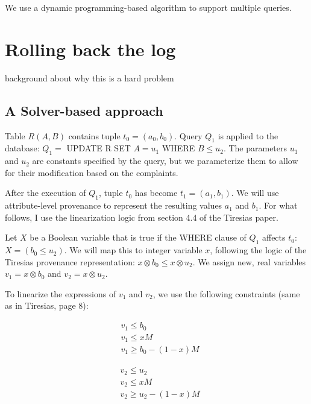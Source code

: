 We use a dynamic programming-based algorithm to support multiple queries.




\section{Rolling back the log}

background about why this is a hard problem

\subsection{A Solver-based approach}

Table $R(A,B)$ contains tuple $t_0=(a_0,b_0)$. Query $Q_1$ is applied to the
database: $Q_1 =$ UPDATE R SET $A=u_1$ WHERE $B\leq u_2$. The parameters $u_1$
and $u_2$ are constants specified by the query, but we parameterize them to
allow for their modification based on the complaints.

\smallskip

After the execution of $Q_1$, tuple $t_0$ has become $t_1=(a_1,b_1)$. We will
use attribute-level provenance to represent the resulting values $a_1$ and
$b_1$. For what follows, I use the linearization logic from section 4.4 of the
Tiresias paper.

\smallskip


Let $X$ be a Boolean variable that is true if the WHERE clause of $Q_1$
affects $t_0$: $X=(b_0\leq u_2)$. We will map this to integer variable $x$,
following the logic of the Tiresias provenance representation: $x\otimes
b_0\leq x\otimes u_2$.  We assign new, real variables $v_1= x\otimes
b_0$ and $v_2=x\otimes u_2$.

\smallskip

To linearize the expressions of $v_1$ and $v_2$, we use the following constraints (same as in Tiresias, page 8):

\begin{minipage}{0.7\textwidth}
    \begin{minipage}[t]{0.2\textwidth}
        \begin{align*}
            &v_1\le b_0\\
            &v_1\le xM\\
            &v_1\ge b_0 - (1-x)M
        \end{align*}
    \end{minipage}
    \hspace{4em}
    \begin{minipage}[t]{0.2\textwidth}
        \begin{align*}
            &v_2\le u_2\\
            &v_2\le xM\\
            &v_2\ge u_2 - (1-x)M
        \end{align*}
    \end{minipage}
\end{minipage}


